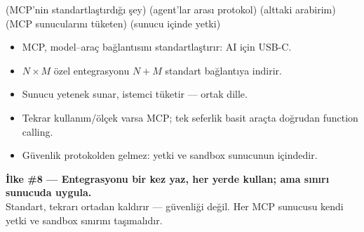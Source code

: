  (MCP'nin standartlaştırdığı şey) \tlsep {} (agent'lar arası protokol) \tlsep
{} (alttaki arabirim) \tlsep {} (MCP sunucularını tüketen) \tlsep
{} (sunucu içinde yetki)

\begin{itemize}
  \item MCP, model--araç bağlantısını standartlaştırır: AI için USB-C.
  \item $N\times M$ özel entegrasyonu $N+M$ standart bağlantıya indirir.
  \item Sunucu yetenek sunar, istemci tüketir --- ortak dille.
  \item Tekrar kullanım/ölçek varsa MCP; tek seferlik basit araçta doğrudan function calling.
  \item Güvenlik protokolden gelmez: yetki ve sandbox sunucunun içindedir.
\end{itemize}

\begin{principlebox}
\textbf{İlke \#8 — Entegrasyonu bir kez yaz, her yerde kullan; ama sınırı sunucuda uygula.}\\[4pt]
\normalsize Standart, tekrarı ortadan kaldırır --- güvenliği değil. Her MCP
sunucusu kendi yetki ve sandbox sınırını taşımalıdır.
\end{principlebox}
